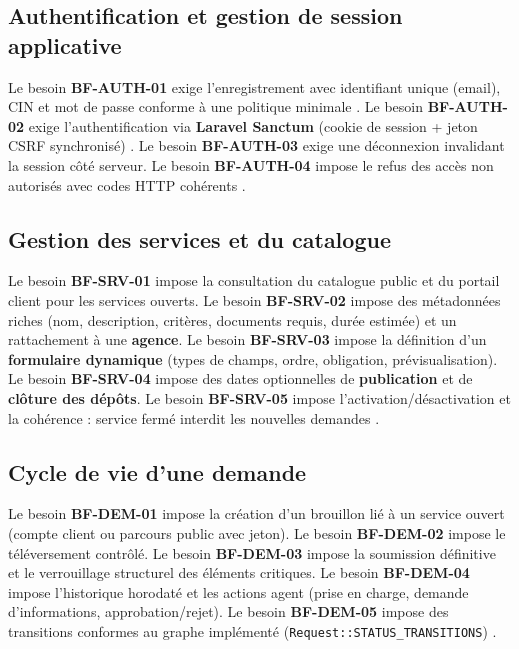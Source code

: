 \subsection{Authentification et gestion de session applicative}

Le besoin \textbf{BF-AUTH-01} exige l'enregistrement avec identifiant unique (email), CIN et mot de passe conforme à une politique minimale \cite{owasp2021}. Le besoin \textbf{BF-AUTH-02} exige l'authentification via \textbf{Laravel Sanctum} (cookie de session + jeton CSRF synchronisé) \cite{sanctumdoc}. Le besoin \textbf{BF-AUTH-03} exige une déconnexion invalidant la session côté serveur. Le besoin \textbf{BF-AUTH-04} impose le refus des accès non autorisés avec codes HTTP cohérents \cite{rfc7231}.

\subsection{Gestion des services et du catalogue}

Le besoin \textbf{BF-SRV-01} impose la consultation du catalogue public et du portail client pour les services ouverts. Le besoin \textbf{BF-SRV-02} impose des métadonnées riches (nom, description, critères, documents requis, durée estimée) et un rattachement à une \textbf{agence}. Le besoin \textbf{BF-SRV-03} impose la définition d'un \textbf{formulaire dynamique} (types de champs, ordre, obligation, prévisualisation). Le besoin \textbf{BF-SRV-04} impose des dates optionnelles de \textbf{publication} et de \textbf{clôture des dépôts}. Le besoin \textbf{BF-SRV-05} impose l'activation/désactivation et la cohérence : service fermé interdit les nouvelles demandes \cite{sommerville2016}.

\subsection{Cycle de vie d'une demande}

Le besoin \textbf{BF-DEM-01} impose la création d'un brouillon lié à un service ouvert (compte client ou parcours public avec jeton). Le besoin \textbf{BF-DEM-02} impose le téléversement contrôlé. Le besoin \textbf{BF-DEM-03} impose la soumission définitive et le verrouillage structurel des éléments critiques. Le besoin \textbf{BF-DEM-04} impose l'historique horodaté et les actions agent (prise en charge, demande d'informations, approbation/rejet). Le besoin \textbf{BF-DEM-05} impose des transitions conformes au graphe implémenté (\texttt{Request::STATUS\_TRANSITIONS}) \cite{date2003}.

